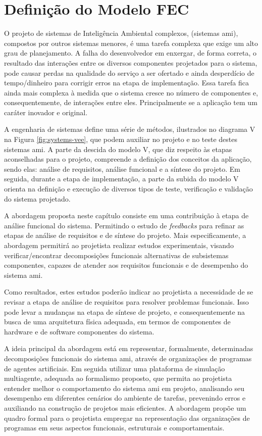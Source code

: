 \chapter{Definição do Modelo FEC} %
\label{cap:abordagem}

    O projeto de sistemas de Inteligência Ambiental complexos, (sistemas \acrshort{ami}), compostos por outros sistemas menores, é uma tarefa complexa que exige um alto grau de planejamento. A falha do desenvolvedor em enxergar, de forma correta, o resultado das interações entre os diversos componentes projetados para o sistema, pode causar perdas na qualidade do serviço a ser ofertado e ainda desperdício de tempo/dinheiro para corrigir erros na etapa de implementação. Essa tarefa fica ainda mais complexa à medida que o sistema cresce no número de componentes e, consequentemente, de interações entre eles. Principalmente se a aplicação tem um caráter inovador e original.

    A engenharia de sistemas define uma série de métodos, ilustrados no diagrama V na Figura \ref{fig:systems-vee}, que podem auxiliar no projeto e no teste destes sistemas \acrshort{ami}. A parte da descida do modelo V, que diz respeito às etapas aconselhadas para o projeto, compreende a definição dos conceitos da aplicação, sendo elas: análise de requisitos, análise funcional e a síntese do projeto. Em seguida, durante a etapa de implementação, a parte da subida do modelo V orienta na definição e execução de diversos tipos de teste, verificação e validação do sistema projetado. 

    A abordagem proposta neste capítulo consiste em uma contribuição à etapa de análise funcional do sistema. Permitindo o estudo de \textit{feedbacks} para refinar as etapas de análise de requisitos e de síntese do projeto. Mais especificamente, a abordagem permitirá ao projetista realizar estudos experimentais, visando verificar/encontrar decomposições funcionais alternativas de subsistemas componentes, capazes de atender aos requisitos funcionais e de desempenho do sistema \acrshort{ami}. 
    
    Como resultados, estes estudos poderão indicar ao projetista a necessidade de se revisar a etapa de análise de requisitos para resolver problemas funcionais. Isso pode levar a mudanças na etapa de síntese de projeto, e consequentemente na busca de uma arquitetura física adequada, em termos de componentes de hardware e de software componentes do sistema. 
    
    A ideia principal da abordagem está em representar, formalmente, determinadas decomposições funcionais do sistema \acrshort{ami}, através de organizações de programas de agentes artificiais. Em seguida utilizar uma plataforma de simulação multiagente, adequada ao formalismo proposto, que permita ao projetista entender melhor o comportamento do sistema \acrshort{ami} em projeto, analisando seu desempenho em diferentes cenários do ambiente de tarefas, prevenindo erros e auxiliando na construção de projetos mais eficientes. A abordagem propõe um quadro formal para o projetista empregar na representação das organizações de programas em seus aspectos funcionais, estruturais e comportamentais.
    
